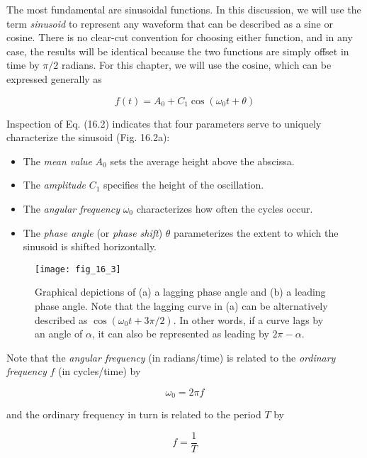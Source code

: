 \documentclass[../main.tex]{subfiles}
\begin{document}
The most fundamental are sinusoidal functions. In this discussion, we will use the term \textit{sinusoid} to represent any waveform that can be described as a sine or cosine. There is no clear-cut convention for choosing either function, and in any case, the results will be identical because the two functions are simply offset in time by $\pi/2$ radians. For this chapter, we will use the cosine, which can be expressed generally as

\begin{equation}
	\tag{16.2}
	f(t) = A_0 + C_1 \cos (\omega_0 t + \theta)
\end{equation}

\noindent Inspection of Eq. (16.2) indicates that four parameters serve to uniquely characterize the
sinusoid (Fig. 16.2a):

\begin{itemize}
	\item The \textit{mean value} $A_0$ sets the average height above the abscissa.
	\item The \textit{amplitude} $C_1$ specifies the height of the oscillation.
	\item The \textit{angular frequency} $\omega_0$ characterizes how often the cycles occur.
	\item The \textit{phase angle} (or \textit{phase shift}) $\theta$ parameterizes the extent to which the sinusoid is shifted horizontally.
\end{itemize}

\begin{figure}[H]
	\centering
	\texttt{[image: fig\_16\_3]}
	\caption{\textsf{Graphical depictions of (a) a lagging phase angle and (b) a leading phase angle. Note that the lagging curve in (a) can be alternatively described as $\cos(\omega_0 t + 3 \pi /2)$. In other words, if a curve lags by an angle of $\alpha$, it can also be represented as leading by $2\pi - \alpha$.}}
	\label{fig:fig_16_3}
\end{figure}

Note that the \textit{angular frequency} (in radians/time) is related to the \textit{ordinary frequency} $f$ (in cycles/time) by %

\begin{equation}
	\tag{16.3}
	\omega_0 = 2 \pi f
\end{equation}

\noindent and the ordinary frequency in turn is related to the period $T$ by

\begin{equation}
	\tag{16.4}
	f = \frac{1}{T}
\end{equation}
\end{document}
